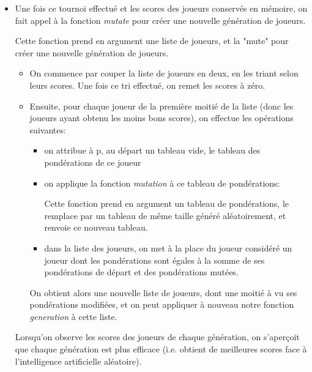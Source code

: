 \documentclass[10pt]{article}
\begin{document}
\begin{enumerate}
\begin{itemize}
\item Une fois ce tournoi effectué et les scores des joueurs conservés en mémoire, on fait appel à la fonction \textit{mutate} pour créer une nouvelle génération de joueurs. 

Cette fonction prend en argument une liste de joueurs, et la "mute" pour créer une nouvelle génération de joueurs. 
\begin{itemize}
    \item On commence par couper la liste de joueurs en deux, en les triant selon leurs scores. Une fois ce tri effectué, on remet les scores à zéro. \item Ensuite, pour chaque joueur de la première moitié de la liste (donc les joueurs ayant obtenu les moins bons scores), on effectue les opérations suivantes: 
    \begin{itemize}
        \item on attribue à p, au départ un tableau vide, le tableau des pondérations de ce joueur
        \item on applique la fonction \textit{mutation} à ce tableau de pondérations: 
        
        Cette fonction prend en argument un tableau de pondérations, le remplace par un tableau de même taille généré aléatoirement, et renvoie ce nouveau tableau. 
        \item dans la liste des joueurs, on met à la place du joueur considéré un joueur dont les pondérations sont égales à la somme de ses pondérations de départ et des pondérations mutées.  
    \end{itemize}
On obtient alors une nouvelle liste de joueurs, dont une moitié à vu ses pondérations modifiées, et on peut appliquer à nouveau notre fonction \textit{generation} à cette liste. 
\end{itemize}

Lorsqu'on observe les scores des joueurs de chaque génération, on s'aperçoit que chaque génération est plus efficace (i.e. obtient de meilleures scores face à l'intelligence artificielle aléatoire). 


\end{itemize}
\end{enumerate}
\end{document}
